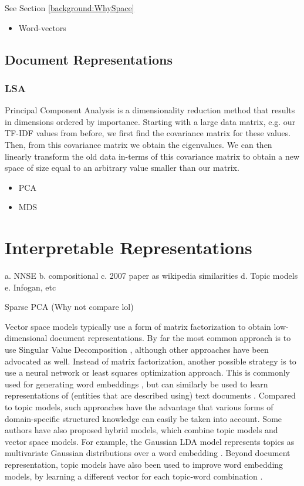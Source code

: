 See Section \ref{background:WhySpace}\begin{itemize}
	\item Word-vectors
\end{itemize}
\subsection{Document Representations}
\subsubsection{LSA}
Principal Component Analysis is a dimensionality reduction method that results in dimensions ordered by importance. Starting with a large data matrix, e.g. our TF-IDF values from before, we first find the covariance matrix for these values. Then, from this covariance matrix we obtain the eigenvalues. We can then linearly transform the old data in-terms of this covariance matrix to obtain a new space of size equal to an arbitrary value smaller than our matrix.
\begin{itemize}
	\item PCA %
	\item MDS
\end{itemize}
\section{Interpretable Representations}
a. NNSE
b. compositional
c. 2007 paper as wikipedia similarities
d. Topic models
e. Infogan, etc

\cite{Zhang2012} Sparse PCA (Why not compare lol)

Vector space models typically use a form of matrix factorization to obtain low-dimensional document representations. By far the most common approach is to use Singular Value Decomposition \cite{ASI:ASI1}, although other approaches have been advocated as well. 
Instead of matrix factorization, another possible strategy is to use a neural network or least squares optimization approach. This is commonly used for generating word embeddings \cite{DBLP:conf/nips/MikolovSCCD13,glove2014}, but can similarly be used to learn representations of (entities that are described using) text documents \cite{DBLP:journals/corr/DaiOL15,van2016learning,DBLP:conf/sigir/JameelBS17}. Compared to topic models, such approaches have the advantage that various forms of domain-specific structured knowledge can easily be taken into account. Some authors have also proposed hybrid models, which combine topic models and vector space models. For example, the Gaussian LDA model represents topics as multivariate Gaussian distributions over a word embedding \cite{DBLP:conf/acl/DasZD15}. Beyond document representation, topic models have also been used to improve word embedding models, by learning a different vector for each topic-word combination \cite{DBLP:conf/aaai/LiuLCS15}. %

